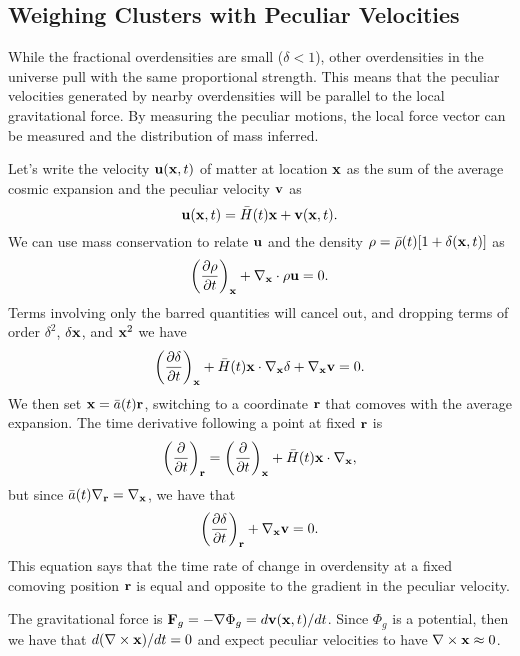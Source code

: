 \documentclass[]{article}
\begin{document}
\subsection{Weighing Clusters with Peculiar Velocities}
While the fractional overdensities are small ($\delta<1$), other
overdensities in the universe pull with the same proportional strength.
This means that the peculiar velocities generated by nearby overdensities
will be parallel to the local gravitational force.  By measuring the
peculiar motions, the local force vector can be measured and the distribution
of mass inferred.

Let's write the velocity $\mathbf{u}(\mathbf{x},t)$ of matter at location $\mathbf{x}$ as the
sum of the average cosmic expansion and the peculiar velocity $\mathbf{v}$ as
\begin{equation}
\mathbf{u}(\mathbf{x},t) = \bar{H}(t)\mathbf{x} + \mathbf{v}(\mathbf{x},t).
\end{equation}
\noindent
We can use mass conservation to relate $\mathbf{u}$ and the density $\rho = \bar{\rho}(t)[1+\delta(\mathbf{x},t)]$ as
\begin{equation}
\left(\frac{\partial \rho}{\partial t}\right)_{\mathbf{x}} + \nabla_{\mathbf{x}}\cdot \rho \mathbf{u} = 0.
\end{equation}
\noindent
Terms involving only the barred quantities will cancel out, and dropping 
terms of order $\delta^2$, $\delta\mathbf{x}$, and $\mathbf{x}^2$ we have
\begin{equation}
\left(\frac{\partial \delta}{\partial t}\right)_{\mathbf{x}} + \bar{H}(t)\mathbf{x} \cdot \nabla_{\mathbf{x}} \delta + \nabla_{\mathbf{x}} \mathbf{v} = 0.
\end{equation}
\noindent
We then set $\mathbf{x} = \bar{a}(t) \mathbf{r}$, switching to a coordinate $\mathbf{r}$ that
comoves with the average expansion.  The time derivative following a 
point at fixed $\mathbf{r}$ is
\begin{equation}
\left(\frac{\partial}{\partial t}\right)_{\mathbf{r}} = \left(\frac{\partial}{\partial t}\right)_{\mathbf{x}} + \bar{H}(t)\mathbf{x} \cdot \nabla_{\mathbf{x}},
\end{equation}
\noindent
but since $\bar{a}(t)\nabla_{\mathbf{r}} = \nabla_{\mathbf{x}}$, we have that
\begin{equation}
\label{eqn:zeldovich}
\left(\frac{\partial \delta}{\partial t}\right)_{\mathbf{r}} + \nabla_{\mathbf{x}}\mathbf{v} = 0.
\end{equation}
\noindent
This equation says that the time rate of change 
in overdensity at a fixed comoving position $\mathbf{r}$ is equal and
opposite to the gradient in the peculiar velocity.

The gravitational force is $\mathbf{F}_g = - \nabla \Phi_g = d\mathbf{v}(\mathbf{x},t)/dt$.  
Since $\Phi_g$ is a potential, then we have 
that $d(\nabla \times \mathbf{x})/dt =0$ and expect peculiar velocities to have
$\nabla \times \mathbf{x} \approx 0$. 
\end{document}
